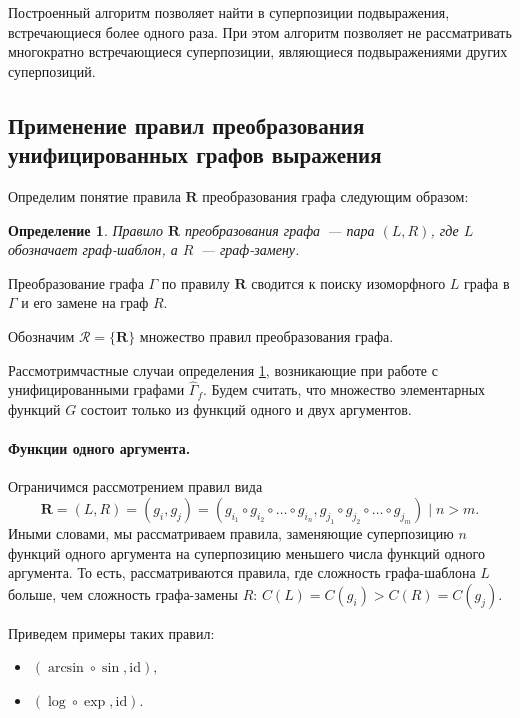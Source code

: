 \documentclass[12pt,a4paper]{article}
\newtheorem{defin}{Определение}
\begin{document}
Построенный алгоритм позволяет найти в суперпозиции подвыражения,
встречающиеся более одного раза. При этом алгоритм позволяет не рассматривать
многократно встречающиеся суперпозиции, являющиеся подвыражениями других
суперпозиций.

\subsection{Применение правил преобразования унифицированных графов выражения}

Определим понятие правила $\mathbf{R}$ преобразования графа следующим образом:
\begin{defin}
  \label{def:rewriting_rule}
  Правило $\mathbf{R}$ преобразования графа~--- пара $(L, R)$, где $L$ обозначает граф-шаблон,
  а $R$~--- граф-замену.
\end{defin}
Преобразование графа $\Gamma$ по правилу $\mathbf{R}$ сводится к поиску
изоморфного $L$ графа в $\Gamma$ и его замене на граф $R$.

Обозначим $\mathcal{R} = \{\mathbf{R}\}$ множество правил преобразования графа.

Рассмотримчастные случаи определения \ref{def:rewriting_rule}, возникающие при работе с
унифицированными графами $\hat{\Gamma}_f$. Будем считать, что множество
элементарных функций $G$ состоит только из функций одного и двух аргументов.

\paragraph{Функции одного аргумента.} Ограничимся рассмотрением правил вида
\begin{equation}
  \label{eq:unary_rule}
  \mathbf{R} = (L, R) = (g_i, g_j) = (g_{i_1} \circ g_{i_2} \circ \dots \circ g_{i_n}, g_{j_1} \circ g_{j_2} \circ \dots \circ g_{j_m}) \mid n > m.
\end{equation}
Иными словами, мы рассматриваем правила, заменяющие суперпозицию $n$ функций
одного аргумента на суперпозицию меньшего числа функций одного аргумента. То
есть, рассматриваются правила, где сложность графа-шаблона $L$ больше, чем
сложность графа-замены $R$: $C(L) = C(g_i) > C(R) = C(g_j)$.

Приведем примеры таких правил:
\begin{itemize}
  \item $(\arcsin \circ \sin, \text{id}),$
  \item $(\log \circ \exp, \text{id}).$
\end{itemize}
\end{document}
